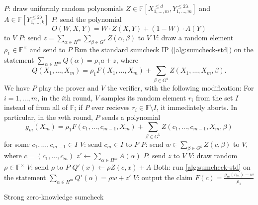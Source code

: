 \documentclass[english,12pt]{reedthesis}
\theoremstyle{plain}
\theoremstyle{definition}
\theoremstyle{remark}
\begin{document}
\begin{algorithm}[htbp]
  $P$: draw uniformly random polynomials
  $Z \in \mathbb{F}[X_{1, \ldots, m}^{\le d}, Y_{1, \ldots, m}^{\le 2\lambda}]$ and
  $A \in \mathbb{F}[Y_{1, \ldots, k}^{\le 2\lambda}]$\;
  $P$: send the polynomial
  \[
    O(W, X, Y) = W \cdot Z(X, Y) + (1 - W) \cdot A(Y)
  \]
  to $V$\;
  $P$: send $z = \sum_{\alpha \in H^{m}}\sum_{\beta \in G^{k}}Z(\alpha, \beta)$ to $V$\;
  $V$: draw a random element $\rho_{1} \in \mathbb{F}^{\times}$ and send to $P$\;
  Run the standard sumcheck IP (\cref{alg:sumcheck-std}) on the statement
  $\sum_{\alpha \in H^{m}}Q(\alpha) = \rho_{1}a + z$, where
  \[
    Q(X_{1}, \ldots, X_{m}) = \rho_{1}F(X_{1}, \ldots, X_{m}) + \sum_{\beta \in G^{k}}Z(X_{1}, \ldots, X_{m}, \beta).
  \]
  We have $P$ play the prover and $V$ the verifier, with the following
  modification: For $i = 1, \ldots, m$, in the $i$th round, $V$ samples its random
  element $r_{i}$ from the set $I$ instead of from all of $\mathbb{F}$; if $P$
  ever recieves $r_{i} \in \mathbb{F} \setminus I$, it immediately aborts. In particular,
  in the $m$th round, $P$ sends a polynomial
  \[
    g_{m}(X_{m}) = \rho_{1}F(c_{1}, \ldots, c_{m-1}, X_{m}) + \sum_{\beta \in G^{k}}Z(c_{1}, \ldots, c_{m-1}, X_{m}, \beta)
  \]
  for some $c_{1}, \ldots, c_{m-1} \in I$\;
  $V$: send $c_{m} \in I$ to $P$\;
  $P$: send $w \in \sum_{\beta \in G^{k}}Z(c, \beta)$ to $V$, where $c = (c_{1}, \ldots, c_{m})$\;
  $z' \leftarrow \sum_{\alpha \in H^{m}}A(\alpha)$\;
  $P$: send $z$ to $V$\;
  $V$: draw random $\rho \in \mathbb{F}^{\times}$\;
  $V$: send $\rho$ to $P$\;
  $Q'(x) \leftarrow \rho Z(c, x) + A$\;
  Both: run \cref{alg:sumcheck-std} on the statement $\sum_{\alpha \in H^{m}}Q'(\alpha) = \rho w + z'$\;
  $V$: output the claim $F(c) = \frac{g_{m}(c_{m}) - w}{\rho_{1}}$\;
  \caption{Strong zero-knowledge sumcheck~\cite[Construction 3]{CFGS22}}\label{alg:zk-sumcheck}
\end{algorithm}
\end{document}
